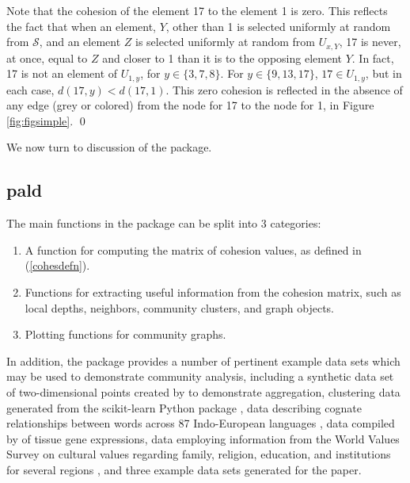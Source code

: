 Note that the cohesion of the element 17 to the element 1 is zero. This reflects the fact that
when an element, \(Y\), other than 1 is selected uniformly at random from \(\mathcal{S}\), and an element \(Z\) is selected uniformly at random from \(U_{x,Y}\), 17 is never, at once, equal to \(Z\) and closer to 1 than it is to the opposing element \(Y\).
In fact, 17 is not an element of \(U_{1,y}\), for \(y\in \{3,7,8\}\). For \(y\in \{9,13,17\}\), \(17\in U_{1,y}\), but in each case, \(d(17,y)<d(17,1)\).
This zero cohesion is reflected in the absence of any edge (grey or colored) from the node for 17 to the node for 1, in Figure \ref{fig:figsimple}. \qed

We now turn to discussion of the  package.

\hypertarget{pald}{%
\subsection{pald}\label{pald}}

The main functions in the  package can be split into 3 categories:

\begin{enumerate}
\def\labelenumi{\arabic{enumi}.}
\tightlist
\item
  A function for computing the matrix of cohesion values, as defined in (\ref{cohesdefn}).
\item
  Functions for extracting useful information from the cohesion matrix, such as local depths, neighbors, community clusters, and graph objects.
\item
  Plotting functions for community graphs.
\end{enumerate}

\noindent In addition, the package provides a number of pertinent example data sets which may be used to demonstrate community analysis, including a synthetic data set of two-dimensional points created by \citet{gionis1clustering} to demonstrate aggregation, clustering data generated from the scikit-learn Python package \citep{pedregosa2011scikit}, data describing cognate relationships between words across 87 Indo-European languages \citep{dyen92}, data compiled by \citet{tissue} of tissue gene expressions, data employing information from the World Values Survey \citep{inglehart2014world} on cultural values regarding family, religion, education, and institutions for several regions \citep{muthukrishna2020beyond}, and three example data sets generated for the \citet{berenhaut2022social} paper.

